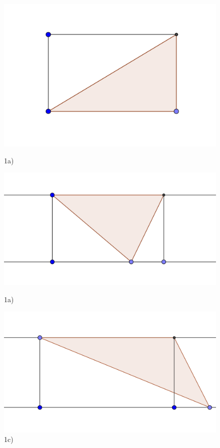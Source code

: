 \begin{figure}[h]
\includegraphics[width=1.2\linewidth]{0a}
\caption{1a)}
\endminipage\hfill
{}
\includegraphics[width=1.2\linewidth]{0c}
\caption{1a)}
\endminipage\hfill
{}
\includegraphics[width=1.2\linewidth]{0b}
\caption{1c)}
\endminipage
\end{figure}

